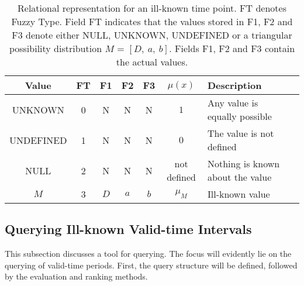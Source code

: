 \vspace{-10pt}

\begin{table}
\centering
\caption{Relational representation for an ill-known time point. FT denotes Fuzzy Type. Field FT indicates that the values stored in F1, F2 and F3 denote either NULL, UNKNOWN, UNDEFINED or a triangular possibility distribution $M$ = $\left[D,\ a,\ b \right]$. Fields F1, F2 and F3 contain the actual values.}%
\begin{tabular}{c c c c c c l p{2cm}}
\hline
Value & FT & F1 & F2 & F3 & $\mu(x)$ & Description \\ \hline
UNKNOWN & 0 & N & N & N  & $1$ & Any value is equally possible\\ 
UNDEFINED & 1 & N & N & N & $0$ & The value is not defined \\%
NULL & 2 & N & N & N &not defined & Nothing is known about the value \\ 
$M$ & 3 & $D$ & $a$ & $b$ & $\mu_{M}$ & Ill-known value \\ 
\hline 
\end{tabular}
\label{table:relational-representation-pvp}

\vspace{10pt}


\end{table}

\vspace{-25pt}

\subsection{Querying Ill-known Valid-time Intervals}
This subsection discusses a tool for querying. The focus will evidently lie on the querying of valid-time periods. First, the query structure will be defined, followed by the evaluation and ranking methods.




